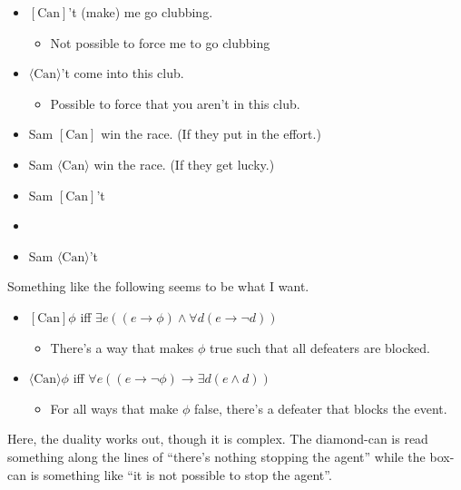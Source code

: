 \documentclass[10pt]{article}
\begin{document}
\begin{itemize}
\item \([\text{Can}]\)'t (make) me go clubbing.
  \begin{itemize}
  \item Not possible to force me to go clubbing
  \end{itemize}
\item \(\langle \text{Can} \rangle\)'t come into this club.
  \begin{itemize}
  \item Possible to force that you aren't in this club.
  \end{itemize}
\end{itemize}

\begin{itemize}
\item Sam \([\text{Can}]\) win the race. (If they put in the effort.)
\item Sam \(\langle \text{Can} \rangle\) win the race. (If they get lucky.)
\end{itemize}

\begin{itemize}
\item Sam \([\text{Can}]\)'t
\item \item Sam \(\langle \text{Can} \rangle\)'t
\end{itemize}

Something like the following seems to be what I want.

\begin{itemize}
\item \([\text{Can}]\phi\) iff \(\exists e((e \rightarrow \phi) \land \forall d(e \rightarrow \lnot d))\)
  \begin{itemize}
  \item There's a way that makes \(\phi\) true such that all defeaters are blocked.
  \end{itemize}
\item \(\langle \text{Can} \rangle\phi\) iff \(\forall e((e \rightarrow \lnot\phi) \rightarrow \exists d(e \land d))\)
  \begin{itemize}
  \item For all ways that make \(\phi\) false, there's a defeater that blocks the event.
  \end{itemize}
\end{itemize}

Here, the duality works out, though it is complex.
The diamond-can is read something along the lines of ``there's nothing stopping the agent'' while the box-can is something like ``it is not possible to stop the agent''.
\end{document}
